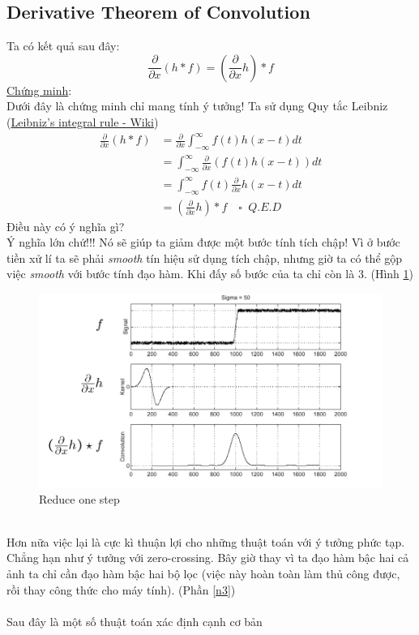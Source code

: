 \documentclass{article}
\begin{document}
    \subsection*{Derivative Theorem of Convolution}
    Ta có kết quả sau đây:
    \begin{equation}
        \frac{\partial}{\partial x} (h*f) = \left(\frac{\partial}{\partial x} h\right)*f
    \end{equation}
    \underline{Chứng minh}:\\
    Dưới đây là chứng minh chỉ mang tính ý tưởng! Ta sử dụng Quy tắc Leibniz (\href{https://en.wikipedia.org/wiki/Leibniz_integral_rule#General_form:_Differentiation_under_the_integral_sign}{Leibniz's integral rule - Wiki})
    $$
    \begin{aligned}
\frac{\partial}{\partial x}(h*f)&= \frac{\partial}{\partial x} \int_{-\infty}^{\infty} f(t)h(x-t)dt\\
&=\int_{-\infty}^{\infty} \frac{\partial}{\partial x} \left( f(t)h(x-t) \right) dt\\
&=\int_{-\infty}^{\infty} f(t) \frac{\partial}{\partial x} h(x-t) dt\\
&=\left(\frac{\partial}{\partial x} h \right)*f \quad \square\phantom{a} Q.E.D
    \end{aligned}
    $$
Điều này có ý nghĩa gì?\\
Ý nghĩa lớn chứ!!! Nó sẽ giúp ta giảm được một bước tính tích chập! Vì ở bước tiền xử lí ta sẽ phải \textit{smooth} tín hiệu sử dụng tích chập, nhưng giờ ta có thể gộp việc \textit{smooth} với bước tính đạo hàm. Khi đấy số bước của ta chỉ còn là 3. (Hình \ref{fig5})
\begin{figure}[ht!]
    \centering
    \includegraphics[width = 0.9\linewidth]{fig5.png}
    \caption{Reduce one step}
    \label{fig5}
\end{figure}
\phantom{a}\\
Hơn nữa việc lại là cực kì thuận lợi cho những thuật toán với ý tưởng phức tạp. Chẳng hạn như ý tưởng với zero-crossing. Bây giờ thay vì ta đạo hàm bậc hai cả ảnh ta chỉ cần đạo hàm bậc hai bộ lọc (việc này hoàn toàn làm thủ công được, rồi thay công thức cho máy tính). (Phần \ref{n3})
\\\\
Sau đây là một số thuật toán xác định cạnh cơ bản
\end{document}
